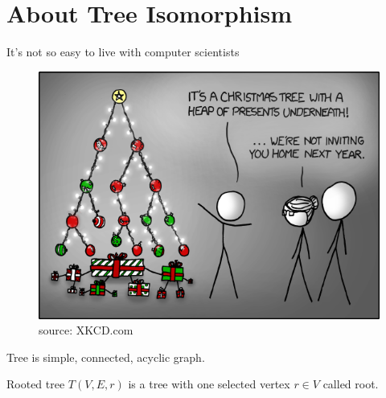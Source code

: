 \documentclass{beamer}
\begin{document}
\section{About Tree Isomorphism}

\begin{frame}{It's not so easy to live with computer scientists}

\begin{figure}
	\includegraphics[scale=0.5]{img1}
	\caption{\label{fig:your-figure} source: XKCD.com}
\end{figure}

\end{frame}


\begin{frame}
\begin{definition}[Tree]
	\alert{Tree} is  simple, connected, acyclic graph.
\end{definition}
\end{frame}

\begin{frame}
\begin{definition}
	\alert{Rooted tree $T(V,E,r)$}  is  a tree with one selected vertex $r \in V$ called root.
\end{definition}
\end{frame}
\end{document}
